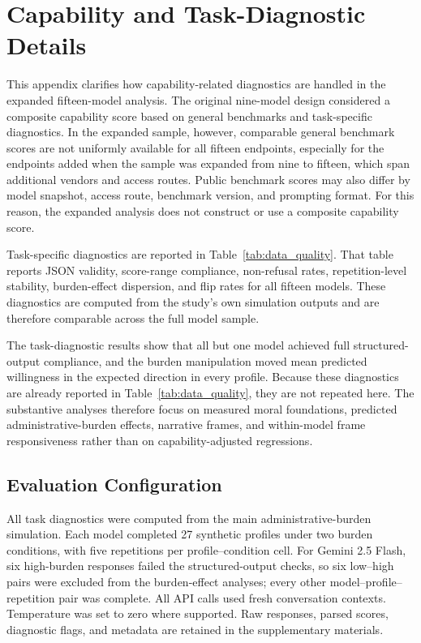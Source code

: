 \documentclass[11pt]{article}
\begin{document}
\clearpage   %
\section{Capability and Task-Diagnostic Details}
\label{app:capability}

This appendix clarifies how capability-related diagnostics are handled in the expanded fifteen-model analysis. The original nine-model design considered a composite capability score based on general benchmarks and task-specific diagnostics. In the expanded sample, however, comparable general benchmark scores are not uniformly available for all fifteen endpoints, especially for the endpoints added when the sample was expanded from nine to fifteen, which span additional vendors and access routes. Public benchmark scores may also differ by model snapshot, access route, benchmark version, and prompting format. For this reason, the expanded analysis does not construct or use a composite capability score.

Task-specific diagnostics are reported in Table~\ref{tab:data_quality}. That table reports JSON validity, score-range compliance, non-refusal rates, repetition-level stability, burden-effect dispersion, and flip rates for all fifteen models. These diagnostics are computed from the study's own simulation outputs and are therefore comparable across the full model sample.

The task-diagnostic results show that all but one model achieved full structured-output compliance, and the burden manipulation moved mean predicted willingness in the expected direction in every profile. Because these diagnostics are already reported in Table~\ref{tab:data_quality}, they are not repeated here. The substantive analyses therefore focus on measured moral foundations, predicted administrative-burden effects, narrative frames, and within-model frame responsiveness rather than on capability-adjusted regressions.

\subsection*{Evaluation Configuration}

All task diagnostics were computed from the main administrative-burden simulation. Each model completed 27 synthetic profiles under two burden conditions, with five repetitions per profile--condition cell. For Gemini 2.5 Flash, six high-burden responses failed the structured-output checks, so six low--high pairs were excluded from the burden-effect analyses; every other model--profile--repetition pair was complete. All API calls used fresh conversation contexts. Temperature was set to zero where supported. Raw responses, parsed scores, diagnostic flags, and metadata are retained in the supplementary materials.
\clearpage
\end{document}
